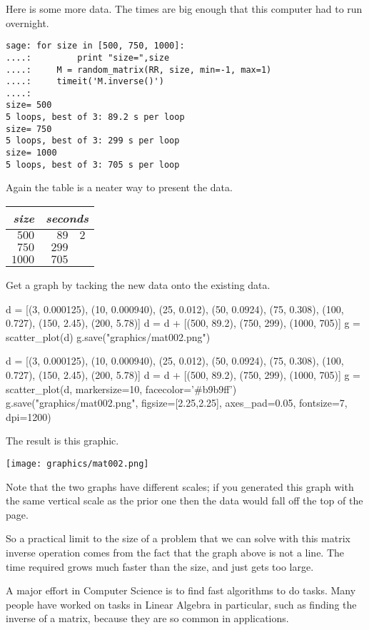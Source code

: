 Here is some more data.
The times are big enough that this computer had to run overnight.
\begin{lstlisting}
sage: for size in [500, 750, 1000]:                             
....:         print "size=",size
....:     M = random_matrix(RR, size, min=-1, max=1)
....:     timeit('M.inverse()')
....: 
size= 500
5 loops, best of 3: 89.2 s per loop
size= 750
5 loops, best of 3: 299 s per loop
size= 1000
5 loops, best of 3: 705 s per loop
\end{lstlisting}
Again the table is a neater way to present the data.
\begin{center}
  \begin{tabular}{r|r@{.}l}
    \textit{size}     &\multicolumn{2}{c}{\textit{seconds}}  \\  \hline
    $500$       &$89$ &$2$ \\
    $750$       &$299$ &   \\
    $1000$      &$705$ &   
  \end{tabular}
\end{center}
Get a graph by tacking the new data onto the existing data.
\begin{sageoutput}[d,0,3]
d = [(3, 0.000125), (10, 0.000940), (25, 0.012),  
     (50, 0.0924), (75, 0.308), (100, 0.727), 
     (150, 2.45), (200, 5.78)]
d = d + [(500, 89.2), (750, 299), (1000, 705)]
g = scatter_plot(d)                           
g.save("graphics/mat002.png")                      
\end{sageoutput}
\begin{sagesilent}
d = [(3, 0.000125), (10, 0.000940), (25, 0.012),  
     (50, 0.0924), (75, 0.308), (100, 0.727), 
     (150, 2.45), (200, 5.78)]
d = d + [(500, 89.2), (750, 299), (1000, 705)]
g = scatter_plot(d, markersize=10, facecolor='#b9b9ff')
g.save("graphics/mat002.png", figsize=[2.25,2.25], axes_pad=0.05, fontsize=7, dpi=1200)              
\end{sagesilent}
The result is this graphic.
\begin{center}
  \texttt{[image: graphics/mat002.png]}
\end{center}
Note that the two graphs have different scales;
if you generated this graph with the same vertical scale as the prior one
then the data would fall off the top of the page.

So a practical limit to the size of a problem that we can solve with
this matrix inverse operation comes from the fact that the graph above is
not a line.
The time required grows much faster than the size, and just gets too large. 

A major effort in Computer Science is to find fast algorithms to 
do tasks.
Many people have worked on tasks in Linear Algebra in particular,
such as finding the inverse of a matrix, because
they are so common in applications.

\endinput


TODO:
